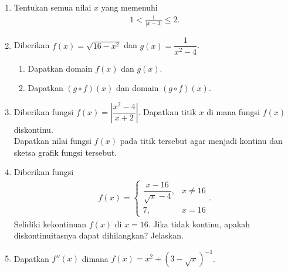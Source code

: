\documentclass[10pt,openany,a4paper]{article}
\theoremstyle{definition}
\theoremstyle{definition}
\theoremstyle{plain}
\begin{document}
\begin{enumerate}
    \item Tentukan semua nilai $x$ yang memenuhi
    \begin{align*}
        1<\frac{1}{|x-3|}\leq 2.
    \end{align*}

    \item Diberikan $f(x)=\sqrt{16-x^2}$ dan $g(x)=\dfrac{1}{x^2-4}$.
    \begin{enumerate}
        \item Dapatkan domain $f(x)$ dan $g(x)$.
        \item Dapatkan $(g\circ f)(x)$ dan domain $(g\circ f)(x)$.
    \end{enumerate}

    \item Diberikan fungsi $f(x)=\left|\dfrac{x^2-4}{x+2}\right|$. Dapatkan titik $x$ di mana fungsi $f(x)$ diskontinu.\\
    Dapatkan nilai fungsi $f(x)$ pada titik tersebut agar menjadi kontinu dan sketsa grafik fungsi tersebut.

    \item Diberikan fungsi
    \begin{align*}
        f(x)=\begin{cases}
            \dfrac{x-16}{\sqrt{x}-4}, & x\neq 16\\
            7, & x=16
        \end{cases}.
    \end{align*}
    Selidiki kekontinuan $f(x)$ di $x=16$. Jika tidak kontinu, apakah diskontinuitasnya dapat dihilangkan? Jelaskan.

    \item Dapatkan $f''(x)$ dimana $f(x)=x^2+\left(3-\sqrt{x}\right)^{-1}$.
\end{enumerate}

\newpage
\end{document}
